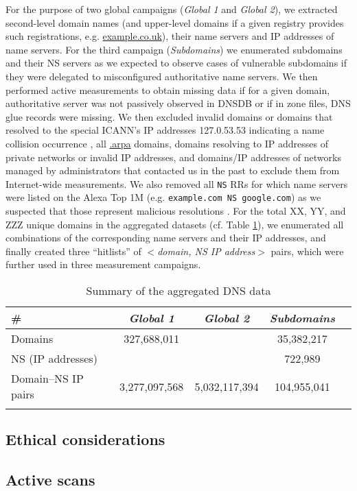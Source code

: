For the purpose of two global campaigns (\textit{Global 1} and \textit{Global 2}),
we extracted second-level domain names  (and upper-level domains if a given registry provides such registrations, e.g. \url{example.co.uk}), their name servers and IP addresses of name servers. 
For the third campaign (\textit{Subdomains}) we enumerated subdomains and their NS servers as we expected to observe cases of vulnerable subdomains if they were delegated to misconfigured authoritative name servers.
We then performed active measurements to obtain missing data if for a given domain, authoritative server was not passively observed in DNSDB or if in zone files, DNS glue records were missing.
We then excluded invalid domains or domains that resolved to the special ICANN's IP addresses 127.0.53.53 indicating a name collision occurrence \cite{127}, %
all \url{.arpa} domains, domains resolving to IP addresses of private networks or invalid IP addresses, and domains/IP addresses of networks managed by administrators that contacted us in the past to exclude them from Internet-wide measurements. 
We also removed all \texttt{NS} RRs for which name servers were listed on the Alexa Top 1M %
(e.g. \texttt{example.com NS google.com}) as we suspected that those represent malicious resolutions \cite{Dagon,wild}.
%
%
For the total XX, YY, and ZZZ unique domains in the aggregated datasets (cf. Table \ref{tab:data}), we enumerated all combinations of the corresponding name servers and their IP addresses, and finally created three ``hitlists'' of \textit{$<$domain, NS IP address$>$} pairs, which were further used in three measurement campaigns. 



\begin{table}
  \caption{Summary of the aggregated DNS data \label{tab:data}}
 \centering
\begin{tabular}{l*{3}{c}r}
\Xhline{2\arrayrulewidth}
\#  & \textbf{\textit{Global 1}} & \textbf{\textit{Global 2}} & \textbf{\textit{Subdomains}}\\
\hline
Domains & 327,688,011 &  & 35,382,217 \\
NS (IP addresses) &  &  & 722,989 \\
Domain--NS IP pairs & 3,277,097,568 & 5,032,117,394 & 104,955,041\\
\Xhline{2\arrayrulewidth}
 \end{tabular}
\end{table}




\subsection{Ethical considerations}
\subsection{Active scans}